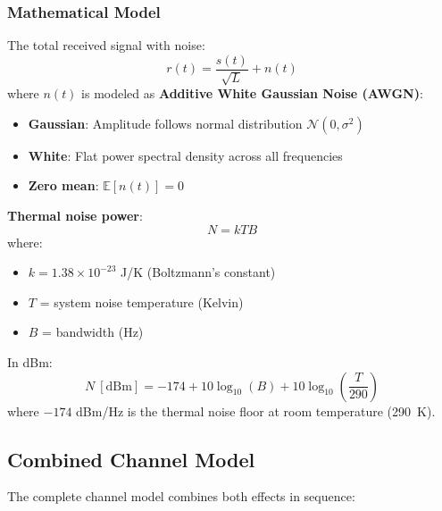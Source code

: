 \subsubsection{Mathematical Model}

The total received signal with noise:
\begin{equation}
r(t) = \frac{s(t)}{\sqrt{L}} + n(t)
\end{equation}
where $n(t)$ is modeled as \textbf{Additive White Gaussian Noise (AWGN)}:
\begin{itemize}
\item \textbf{Gaussian}: Amplitude follows normal distribution $\mathcal{N}(0, \sigma^2)$
\item \textbf{White}: Flat power spectral density across all frequencies
\item \textbf{Zero mean}: $\mathbb{E}[n(t)] = 0$
\end{itemize}

\textbf{Thermal noise power}:
\begin{equation}
N = kTB
\end{equation}
where:
\begin{itemize}
\item $k = 1.38 \times 10^{-23}$ J/K (Boltzmann's constant)
\item $T$ = system noise temperature (Kelvin)
\item $B$ = bandwidth (Hz)
\end{itemize}

In dBm:
\begin{equation}
N\ [\text{dBm}] = -174 + 10\log_{10}(B) + 10\log_{10}\left(\frac{T}{290}\right)
\end{equation}
where $-174$ dBm/Hz is the thermal noise floor at room temperature (290~K).

\subsection{Combined Channel Model}

The complete channel model combines both effects in sequence:

